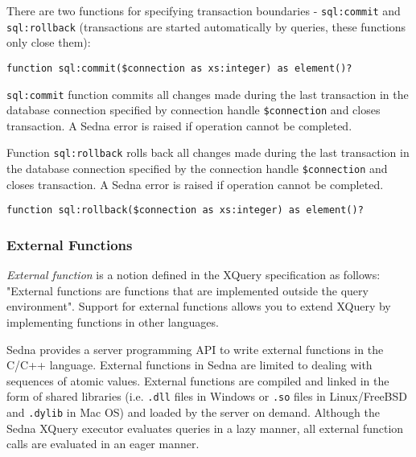 \documentclass[a4paper,12pt]{article}
\begin{document}
There are two functions for specifying transaction boundaries -
\verb!sql:commit! and \verb!sql:rollback! (transactions are started
automatically by queries, these functions only close them):

\begin{verbatim}
function sql:commit($connection as xs:integer) as element()?
\end{verbatim}

\verb!sql:commit! function commits all changes made during the last transaction
in the database connection specified by connection handle \verb!$connection! and
closes transaction. A Sedna error is raised if operation cannot be completed.

Function \verb!sql:rollback! rolls back all changes made during the last
transaction in the database connection specified by the connection handle
\verb!$connection! and closes transaction. A Sedna error is raised if operation
cannot be completed.

\begin{verbatim}
function sql:rollback($connection as xs:integer) as element()?
\end{verbatim}


\subsubsection{External Functions}

\emph{External function} is a notion defined in the XQuery specification
\cite{paper:query-language} as follows: "External functions are functions that
are implemented outside the query environment". Support for external functions
allows you to extend XQuery by implementing functions in other languages.

Sedna provides a server programming API to write external functions in the C/C++
language. External functions in Sedna are limited to dealing with sequences of
atomic values. External functions are compiled and linked in the form of shared
libraries (i.e. \verb!.dll! files in Windows or \verb!.so! files in
Linux/FreeBSD and \verb!.dylib! in Mac OS) and loaded by the server on demand.
Although the Sedna XQuery executor evaluates queries in a lazy manner, all
external function calls are evaluated in an eager manner.
\end{document}
